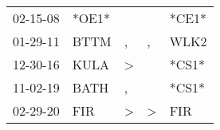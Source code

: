 \begin{supertabular}{lllll}
 02-15-08 &  *OE1* &               &               &  *CE1* \\
 01-29-11 &   BTTM &             , &             , &   WLK2 \\
 12-30-16 &   KULA &  \textgreater &               &  *CS1* \\
 11-02-19 &   BATH &             , &               &  *CS1* \\
 02-29-20 &    FIR &  \textgreater &  \textgreater &    FIR \\
\end{supertabular}
